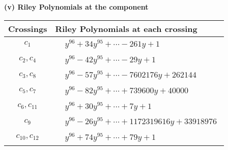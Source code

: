 \documentclass[1p]{elsarticle_modified}
\theoremstyle{definition}
\begin{document}
\flushleft \textbf{(v) Riley Polynomials at the component}\newline \\
\begin{tabular}{m{50pt}|m{274pt}}
Crossings & \hspace{64pt}Riley Polynomials at each crossing \\
\hline $$\begin{aligned}c_{1}\end{aligned}$$&$\begin{aligned}
&y^{96}+34 y^{95}+\cdots-261 y+1
\end{aligned}$\\
\hline $$\begin{aligned}c_{2},c_{4}\end{aligned}$$&$\begin{aligned}
&y^{96}-42 y^{95}+\cdots-29 y+1
\end{aligned}$\\
\hline $$\begin{aligned}c_{3},c_{8}\end{aligned}$$&$\begin{aligned}
&y^{96}-57 y^{95}+\cdots-7602176 y+262144
\end{aligned}$\\
\hline $$\begin{aligned}c_{5},c_{7}\end{aligned}$$&$\begin{aligned}
&y^{96}-82 y^{95}+\cdots+739600 y+40000
\end{aligned}$\\
\hline $$\begin{aligned}c_{6},c_{11}\end{aligned}$$&$\begin{aligned}
&y^{96}+30 y^{95}+\cdots+7 y+1
\end{aligned}$\\
\hline $$\begin{aligned}c_{9}\end{aligned}$$&$\begin{aligned}
&y^{96}-26 y^{95}+\cdots+1172319616 y+33918976
\end{aligned}$\\
\hline $$\begin{aligned}c_{10},c_{12}\end{aligned}$$&$\begin{aligned}
&y^{96}+74 y^{95}+\cdots+79 y+1
\end{aligned}$\\
\hline
\end{tabular}\\~\\
\end{document}
